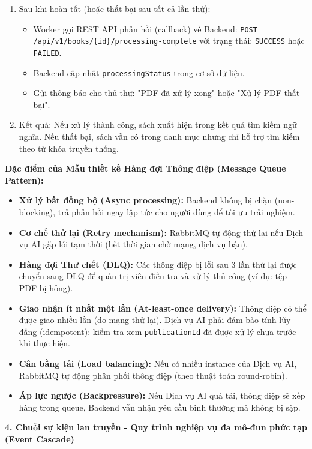 \begin{enumerate}
    \item Sau khi hoàn tất (hoặc thất bại sau tất cả lần thử):
    \begin{itemize}
        \item Worker gọi REST API phản hồi (callback) về Backend: \texttt{POST /api/v1/books/\{id\}/processing-complete} với trạng thái: \texttt{SUCCESS} hoặc \texttt{FAILED}.
        \item Backend cập nhật \texttt{processingStatus} trong cơ sở dữ liệu.
        \item Gửi thông báo cho thủ thư: "PDF đã xử lý xong" hoặc "Xử lý PDF thất bại".
    \end{itemize}
    
    \item Kết quả: Nếu xử lý thành công, sách xuất hiện trong kết quả tìm kiếm ngữ nghĩa. Nếu thất bại, sách vẫn có trong danh mục nhưng chỉ hỗ trợ tìm kiếm theo từ khóa truyền thống.
\end{enumerate}

\textbf{Đặc điểm của Mẫu thiết kế Hàng đợi Thông điệp (Message Queue Pattern):}
\begin{itemize}
    \item \textbf{Xử lý bất đồng bộ (Async processing):} Backend không bị chặn (non-blocking), trả phản hồi ngay lập tức cho người dùng để tối ưu trải nghiệm.
    \item \textbf{Cơ chế thử lại (Retry mechanism):} RabbitMQ tự động thử lại nếu Dịch vụ AI gặp lỗi tạm thời (hết thời gian chờ mạng, dịch vụ bận).
    \item \textbf{Hàng đợi Thư chết (DLQ):} Các thông điệp bị lỗi sau 3 lần thử lại được chuyển sang DLQ để quản trị viên điều tra và xử lý thủ công (ví dụ: tệp PDF bị hỏng).
    \item \textbf{Giao nhận ít nhất một lần (At-least-once delivery):} Thông điệp có thể được giao nhiều lần (do mạng thử lại). Dịch vụ AI phải đảm bảo tính lũy đẳng (idempotent): kiểm tra xem \texttt{publicationId} đã được xử lý chưa trước khi thực hiện.
    \item \textbf{Cân bằng tải (Load balancing):} Nếu có nhiều instance của Dịch vụ AI, RabbitMQ tự động phân phối thông điệp (theo thuật toán round-robin).
    \item \textbf{Áp lực ngược (Backpressure):} Nếu Dịch vụ AI quá tải, thông điệp sẽ xếp hàng trong queue, Backend vẫn nhận yêu cầu bình thường mà không bị sập.
\end{itemize}

\textbf{4. Chuỗi sự kiện lan truyền - Quy trình nghiệp vụ đa mô-đun phức tạp (Event Cascade)}

